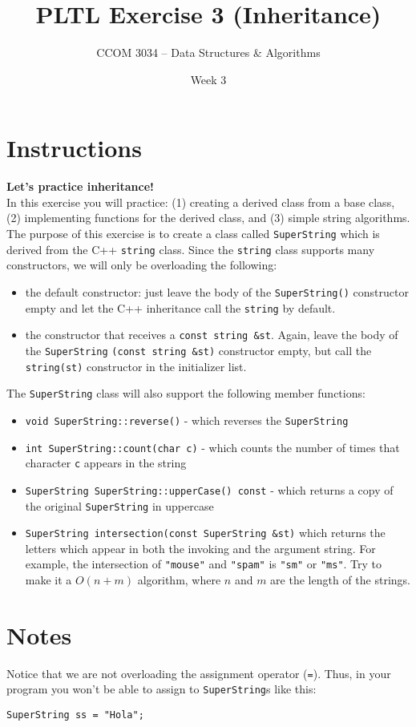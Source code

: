 \documentclass[11 pt]{article}
\title{PLTL Exercise 3 (Inheritance)}
\author{CCOM 3034 – Data Structures \& Algorithms}
\date{Week 3}
\begin{document}
\maketitle



\section{Instructions}

\textbf{Let's practice inheritance!} \\

\noindent In this exercise you will practice: (1) creating a derived class from a base class, (2) implementing functions for the derived class, and (3) simple string algorithms. \\

\noindent The purpose of this exercise is to create a class called \texttt{SuperString} which is derived from the C++ \verb|string| class. Since the \verb|string| class supports many constructors, we will only be overloading the following:

\begin{itemize}
    \item the default constructor: just leave the body of the \verb|SuperString()| constructor empty and let the C++ inheritance call the \verb|string| by default.
    \item the constructor that receives a \texttt{const string \&st}. Again, leave the body of the \verb|SuperString| \verb|(const string &st)| constructor empty, but call the \verb|string(st)| constructor in the initializer list.
\end{itemize}

\noindent The \texttt{SuperString} class will also support the following member functions:

\begin{itemize}
    \item \texttt{void SuperString::reverse()} - which reverses the \texttt{SuperString}
    \item \texttt{int SuperString::count(char c)} - which counts the number of times that character \texttt{c} appears in the string
    \item \texttt{SuperString SuperString::upperCase() const} - which returns a copy of the original \texttt{SuperString} in uppercase
    \item \verb|SuperString intersection(const SuperString &st)| which returns the letters which appear in both the invoking and the argument string. For example, the intersection of \verb|"mouse"| and \verb|"spam"| is \verb|"sm"| or \verb|"ms"|. Try to make it a $O(n+m)$ algorithm, where $n$ and $m$ are the length of the strings. 
\end{itemize}

\section{Notes}

\noindent Notice that we are not overloading the assignment operator (\texttt{=}). Thus, in your program you won't be able to assign to \texttt{SuperString}s like this:

\begin{center}
    \texttt{SuperString ss = "Hola";}
\end{center}
\end{document}
